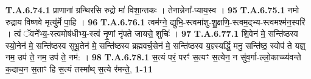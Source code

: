 \documentclass[17pt]{extarticle}
\begin{document}
                                \textbf{ T.A.6.74.1} \newline
                  प्राणानां ग्रन्थिरसि रुद्रो मा॑ विशा॒न्तकः ।  तेनान्नेना᳚-प्याय॒स्व । \textbf{ 95} \newline
                  \newline
                                                         \textbf{} \newline \newline
                                \textbf{ T.A.6.75.1} \newline
                  नमो रुद्राय विष्णवे मृत्यु॑र्मे पा॒हि । \textbf{ 96} \newline
                  \newline
                                                         \textbf{} \newline \newline
                                \textbf{ T.A.6.76.1} \newline
                  त्वम॑ग्ने॒ द्युभि॒-स्त्वमा॑शु-शु॒क्षणि॒-स्त्वम॒द्भ्य-स्त्वमश्म॑न॒स्परि॑ । त्वं ॅवने᳚भ्य॒-स्त्वमोष॑धीभ्य॒-स्त्वं नृ॒णां नृ॑पते जायसे॒ शुचिः॑ । \textbf{ 97} \newline
                  \newline
                                                         \textbf{} \newline \newline
                                \textbf{ T.A.6.77.1} \newline
                  शि॒वेन॑ मे॒ सन्ति॑ष्ठस्व स्यो॒नेन॑ मे॒ सन्ति॑ष्ठस्व सुभू॒तेन॑ मे॒ सन्ति॑ष्ठस्व ब्रह्मवर्च॒सेन॑ मे॒ सन्ति॑ष्ठस्व य॒ज्ञ्स्यर्द्धि॒ मनु॒ सन्ति॑ष्ठ॒ स्वोप॑ ते यज्ञ्॒ नम॒ उप॑ ते॒ नम॒ उप॑ ते॒ नम॑: । \textbf{ 98} \newline
                  \newline
                                                         \textbf{} \newline \newline
                                \textbf{ T.A.6.78.1} \newline
                  स॒त्यं परं॒ परꣳ॑ स॒त्यꣳ स॒त्येन॒ न सु॑व॒र्गा-ल्लो॒काच्च्य॑वन्ते क॒दाच॒न स॒ताꣳ हि स॒त्यं तस्मा᳚थ् स॒त्ये र॑मन्ते॒, \textbf{ 1-11} \newline
                  \newline
                                                         \textbf{} \newline \newline
\end{document}
